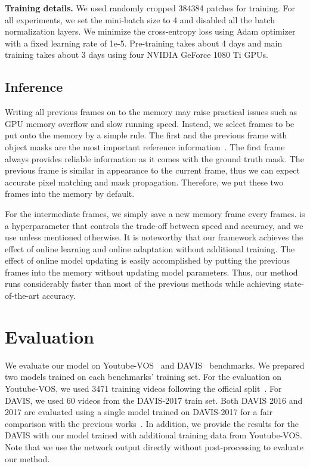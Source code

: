 \documentclass[10pt,twocolumn,letterpaper]{article}
\renewcommand{\paragraph}[1]{\vspace{1mm}\noindent\textbf{#1}}
\begin{document}
\paragraph{Training details.}
We used randomly cropped 384384 patches for training. 
For all experiments, we set the mini-batch size to 4 and disabled all the batch normalization layers.  
We minimize the cross-entropy loss using Adam optimizer~\cite{kingma2014adam} with a fixed learning rate of 1e-5. 
Pre-training takes about 4 days and main training takes about 3 days using four NVIDIA GeForce 1080 Ti GPUs.


\subsection{Inference}\label{Sect:inference}
Writing all previous frames on to the memory may raise practical issues such as GPU memory overflow and slow running speed. 
Instead, we select frames to be put onto the memory by a simple rule.  
The first and the previous frame with object masks are the most important reference information~\cite{perazzi2017learning, oh2018fast, yang2018efficient}. 
The first frame always provides reliable information as it comes with the ground truth mask. 
The previous frame is similar in appearance to the current frame, thus we can expect accurate pixel matching and mask propagation. 
Therefore, we put these two frames into the memory by default.


For the intermediate frames, we simply save a new memory frame every  frames. 
 is a hyperparameter that controls the trade-off between speed and accuracy, and we use  unless mentioned otherwise.  
It is noteworthy that our framework achieves the effect of online learning and online adaptation without additional training. 
The effect of online model updating is easily accomplished by putting the previous frames into the memory without updating model parameters. 
Thus, our method runs considerably faster than most of the previous methods while achieving state-of-the-art accuracy. 












\section{Evaluation}
We evaluate our model on Youtube-VOS~\cite{xu2018youtube_tech} and DAVIS~\cite{Perazzi2016,Pont-Tuset_arXiv_2017} benchmarks. 
We prepared two models trained on each benchmarks' training set.
For the evaluation on Youtube-VOS, we used 3471 training videos following the official split~\cite{xu2018youtube_tech}.
For DAVIS, we used 60 videos from the DAVIS-2017 train set.
Both DAVIS 2016 and 2017 are evaluated using a single model trained on DAVIS-2017 for a fair comparison with the previous works~\cite{oh2018fast, yang2018efficient}.
In addition, we provide the results for the DAVIS with our model trained with additional training data from Youtube-VOS.
Note that we use the network output directly without post-processing to evaluate our method.
\end{document}
